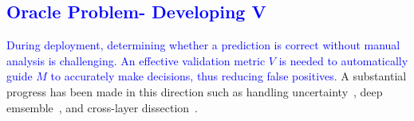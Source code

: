 
\subsection{\textcolor{blue}{Oracle Problem- Developing V}}
\textcolor{blue}{During deployment, determining whether a prediction is correct without manual analysis is challenging. An effective validation metric \(V\) is needed to automatically guide \(M\) to accurately make decisions, thus reducing false positives.}  A substantial progress has been made in this direction such as handling uncertainty\textcolor{blue}{~\cite{guo2017calibration,wang2020dissector,hendrycks2018baseline,gal2016dropout, alon2019code2vec,xiao2019quantifying,vasudevan2019towards,corbiere2019addressing, monarch2021human, steinhardt2016unsupervised,shannon1948mathematical}}, deep emsemble~\cite{lakshminarayanan2017simple}, and cross-layer dissection~\cite{wang2020dissector}.



